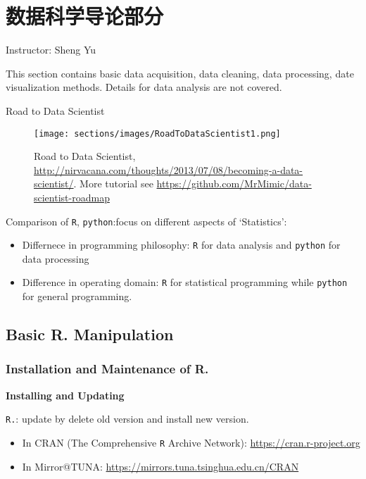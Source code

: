 \chapter{数据科学导论部分}\label{SecDataScience}
\begin{center}
    Instructor: Sheng Yu
\end{center}

    This section contains basic data acquisition, data cleaning, data processing, date visualization methods. Details for data analysis are not covered.

\begin{point}
    Road to Data Scientist
\end{point}

\begin{figure}[H]
    \centering
    \texttt{[image: sections/images/RoadToDataScientist1.png]}
    \caption{Road to Data Scientist, \url{http://nirvacana.com/thoughts/2013/07/08/becoming-a-data-scientist/}. More tutorial see \url{https://github.com/MrMimic/data-scientist-roadmap}}
    \label{RoadToDataScience}
\end{figure}


Comparison of \lstinline|R|, \lstinline|python|:focus on different aspects of `Statistics':
\begin{itemize}[topsep=2pt,itemsep=0pt]
    \item Differnece in programming philosophy: \lstinline|R| for data analysis and \lstinline|python| for data processing
    \item Difference in operating domain: \lstinline|R| for statistical programming while \lstinline|python| for general programming.
\end{itemize}



\section{Basic R. Manipulation}


\subsection{Installation and Maintenance of R.}
\begin{point}
    \textbf{Installing and Updating} 
\end{point}

\noindent  \lstinline|R.|: update by delete old version and install new version.
\begin{itemize}[topsep=2pt,itemsep=0pt]
    \item In CRAN (The Comprehensive \lstinline|R| Archive Network): \url{https://cran.r-project.org}
    \item In Mirror@TUNA: \url{https://mirrors.tuna.tsinghua.edu.cn/CRAN}
\end{itemize}

